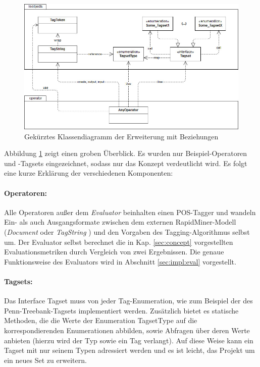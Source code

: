  
\begin{figure}[htb]
	\captionsetup{justification=centering,margin=2cm}
	\includegraphics[width=\textwidth]{gfx/uml_rough.jpg}
	\caption{Gekürztes Klassendiagramm der Erweiterung mit Beziehungen}
	\label{fig:impl:structure:overview}
\end{figure}

Abbildung \ref{fig:impl:structure:overview} zeigt einen groben Überblick. Es wurden nur Beispiel-Operatoren und -Tagsets eingezeichnet, sodass nur das Konzept verdeutlicht wird. Es folgt eine kurze Erklärung der verschiedenen Komponenten:

\paragraph{Operatoren:} Alle Operatoren außer dem \textit{Evaluator} beinhalten einen POS-Tagger und wandeln Ein- als auch Ausgangsformate zwischen dem externen RapidMiner-Modell (\textit{Document} oder \textit{TagString} ) und den Vorgaben des Tagging-Algorithmus selbst um. Der Evaluator selbst berechnet die in Kap. \ref{sec:concept} vorgestellten Evaluationsmetriken durch Vergleich von zwei Ergebnissen. Die genaue Funktionsweise des Evaluators wird in Abschnitt \ref{sec:impl:eval} vorgestellt.

\paragraph{Tagsets:} Das Interface Tagset muss von jeder Tag-Enumeration, wie zum Beispiel der des Penn-Treebank-Tagsets implementiert werden. Zusätzlich bietet es statische Methoden, die die Werte der Enumeration TagsetType auf die korrespondierenden Enumerationen abbilden, sowie Abfragen über deren Werte anbieten (hierzu wird der Typ sowie ein Tag verlangt). Auf diese Weise kann ein Tagset mit nur seinem Typen adressiert werden und es ist leicht, das Projekt um ein neues Set zu erweitern.

